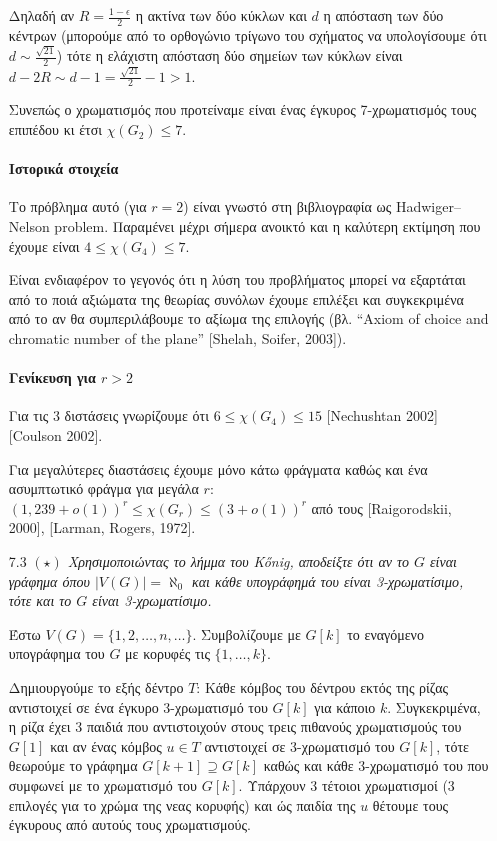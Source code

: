 \documentclass[a4paper, oneside, 11pt]{article}
\theoremstyle{definition}
\begin{document}
\begin{enumerate}
   Δηλαδή αν $R = \frac{1-\epsilon}{2}$
   η ακτίνα των δύο κύκλων και $d$ η απόσταση των δύο κέντρων
   (μπορούμε από το ορθογώνιο τρίγωνο του σχήματος να υπολογίσουμε
   ότι $d \sim \frac{\sqrt{21}}{2}$) τότε η ελάχιστη απόσταση
   δύο σημείων των κύκλων είναι $d - 2R \sim d - 1
   = \frac{\sqrt{21}}{2} - 1 > 1$.

   Συνεπώς ο χρωματισμός που προτείναμε είναι ένας έγκυρος 7-χρωματισμός
   τους επιπέδου κι έτσι $\chi(G_2) \leq 7$.

   \paragraph{Ιστορικά στοιχεία}

   Το πρόβλημα αυτό (για $r = 2$) είναι γνωστό στη βιβλιογραφία
   ως Hadwiger–Nelson problem. Παραμένει μέχρι σήμερα ανοικτό
   και η καλύτερη εκτίμηση που έχουμε είναι $4 \leq \chi(G_4) \leq 7$.
   
   Είναι ενδιαφέρον το γεγονός ότι η λύση του προβλήματος μπορεί
   να εξαρτάται από το ποιά αξιώματα της θεωρίας συνόλων έχουμε
   επιλέξει και συγκεκριμένα από το αν θα συμπεριλάβουμε το αξίωμα
   της επιλογής (βλ. ``Axiom of choice and chromatic number of the plane''
   [Shelah, Soifer, 2003]).

   \paragraph{Γενίκευση για $r > 2$}

   Για τις 3 διστάσεις γνωρίζουμε ότι $6 \leq \chi(G_4) \leq 15$
   [Nechushtan 2002] [Coulson 2002].

   Για μεγαλύτερες διαστάσεις έχουμε μόνο κάτω φράγματα
   καθώς και ένα ασυμπτωτικό φράγμα για μεγάλα $r$:
   $(1,239 + o(1))^r \leq \chi(G_r) \leq (3 + o(1))^r$ από
   τους [Raigorodskii, 2000], [Larman, Rogers, 1972].

   \item[7.3] \emph{$(\star)$ Χρησιμοποιώντας το λήμμα του K\H{o}nig, αποδείξτε
   ότι αν το $G$ είναι γράφημα όπου $|V(G)| = \aleph_0$ και κάθε υπογράφημά
   του είναι 3-χρωματίσιμο, τότε και το $G$ είναι 3-χρωματίσιμο.}

   Έστω $V(G) = \{ 1, 2, \ldots, n, \ldots \}$. Συμβολίζουμε με $G[k]$
   το εναγόμενο υπογράφημα του $G$ με κορυφές τις $\{1, \ldots, k\}$.

   Δημιουργούμε το εξής δέντρο $T$: Κάθε κόμβος του δέντρου εκτός της ρίζας
   αντιστοιχεί σε ένα έγκυρο 3-χρωματισμό του $G[k]$ για κάποιο $k$.
   Συγκεκριμένα, η ρίζα έχει 3 παιδιά που αντιστοιχούν στους τρεις πιθανούς
   χρωματισμούς του $G[1]$ και αν ένας κόμβος $u \in T$ αντιστοιχεί σε
   3-χρωματισμό
   του $G[k]$, τότε θεωρούμε το γράφημα $G[k+1] \supseteq G[k]$ καθώς και κάθε
   3-χρωματισμό του που συμφωνεί με το χρωματισμό του $G[k]$. Υπάρχουν
   3 τέτοιοι χρωματισμοί (3 επιλογές για το χρώμα της νεας κορυφής)
   και ώς παιδία της $u$ θέτουμε τους έγκυρους από αυτούς
   τους χρωματισμούς.


\end{enumerate}
\end{document}
